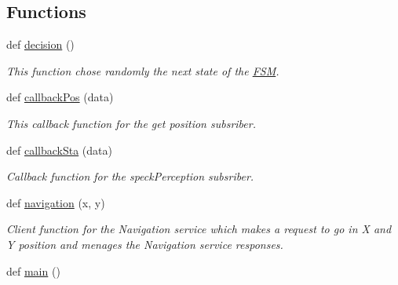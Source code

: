 \subsection*{Functions}
\begin{DoxyCompactItemize}
\item 
def \hyperlink{namespacecommandManager_a4b8947837e5d1af29943bfcf09e748f4}{decision} ()
\begin{DoxyCompactList}\small\item\em This function chose randomly the next state of the \hyperlink{namespaceFSM}{F\+SM}. \end{DoxyCompactList}\item 
def \hyperlink{namespacecommandManager_afef8f89a2132d42ee1e538e12cca47ec}{callback\+Pos} (data)
\begin{DoxyCompactList}\small\item\em This callback function for the get position subsriber. \end{DoxyCompactList}\item 
def \hyperlink{namespacecommandManager_a17f50b385bbd12f96d20b91e1fb43e93}{callback\+Sta} (data)
\begin{DoxyCompactList}\small\item\em Callback function for the speck\+Perception subsriber. \end{DoxyCompactList}\item 
def \hyperlink{namespacecommandManager_a39a4b5ee79aceca08d85ee68043b46ad}{navigation} (x, y)
\begin{DoxyCompactList}\small\item\em Client function for the Navigation service which makes a request to go in X and Y position and menages the Navigation service responses. \end{DoxyCompactList}\item 
def \hyperlink{namespacecommandManager_ae8b570eb4bf393859bc74c9cb5fe125f}{main} ()
\end{DoxyCompactItemize}
